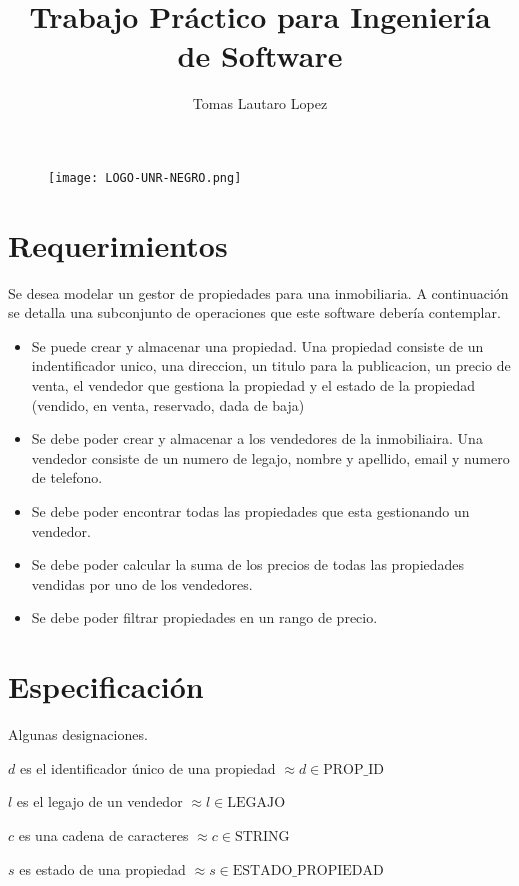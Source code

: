\documentclass[12pt]{article}
\title{Trabajo Práctico para Ingeniería de Software}
\author{Tomas Lautaro Lopez}
\newcommand{\desig}[2]{\item #1 $\approx #2$}
\newenvironment{designations}
  {\begin{leftbar}
    \begin{list}{}{\setlength{\labelsep}{0cm}
                   \setlength{\labelwidth}{0cm}
                   \setlength{\listparindent}{0cm}
                   \setlength{\rightmargin}{\leftmargin}}}
  {\end{list}\end{leftbar}}
\begin{document}
\maketitle

\begin{figure}[h]
\centering
\texttt{[image: LOGO-UNR-NEGRO.png]}
\end{figure}


\section{Requerimientos}
Se desea modelar un gestor de propiedades para una inmobiliaria. A continuación se detalla una subconjunto de operaciones que este software debería contemplar.

\begin{itemize}
    \item{Se puede crear y almacenar una propiedad. Una propiedad consiste de un indentificador unico, una direccion, un titulo para la publicacion, un precio de venta, el vendedor que gestiona la propiedad y el estado de la propiedad (vendido, en venta, reservado, dada de baja)
}
    \item{Se debe poder crear y almacenar a los vendedores de la inmobiliaira. Una vendedor consiste de un numero de legajo, nombre y apellido, email y numero de telefono.
}
    \item{Se debe poder encontrar todas las propiedades que esta gestionando un vendedor.
}
    \item{Se debe poder calcular la suma de los precios de todas las propiedades vendidas por uno de los vendedores.
    }
    \item{Se debe poder filtrar propiedades en un rango de precio.
}
    
\end{itemize}

\section{Especificación}

Algunas designaciones.

\begin{designations}
    \desig{$d$ es el identificador único de una propiedad}{d \in \text{PROP\_ID}}
    \desig{$l$ es el legajo de un vendedor}{l \in \text{LEGAJO}}
    \desig{$c$ es una cadena de caracteres}{c  \in \text{STRING}}
    \desig{$s$ es estado de una propiedad}{s  \in \text{ESTADO\_PROPIEDAD}}
\end{designations}
\end{document}
